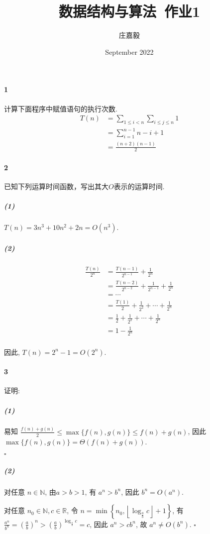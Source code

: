 \documentclass{ctexart}
\title{数据结构与算法~作业1}
\author{庄嘉毅}
\date{September 2022}
\def\QED{\hfill $\square$}
\begin{document}
\maketitle

\paragraph*{1} 计算下面程序中赋值语句的执行次数.
\begin{align*}
    T(n) & = \sum_{1\le i<n} \sum_{i\le j \le n}1 \\
         & =\sum_{i=1}^{n-1} n-i+1                \\
         & = \frac{(n+2)(n-1)}{2}
\end{align*}

\paragraph*{2} 已知下列运算时间函数，写出其大$O$表示的运算时间.

\subparagraph*{(1)} $T(n)=3n^3+10n^2+2n=O(n^3)$.

\subparagraph*{(2)}
\begin{align*}
    \frac{T(n)}{2^n} & = \frac{T(n-1)}{2^{n-1}} + \frac{1}{2^n}                     \\
                     & = \frac{T(n-2)}{2^{n-2}} + \frac{1}{2^{n-1}} + \frac{1}{2^n} \\
                     & = \cdots                                                     \\
                     & = \frac{T(1)}{2} + \frac{1}{2^2} + \cdots + \frac{1}{2^n}    \\
                     & = \frac{1}{2} + \frac{1}{2^2} + \cdots + \frac{1}{2^n}       \\
                     & = 1 - \frac{1}{2^n}                                          \\
\end{align*}

因此, $T(n)=2^n-1=O(2^n)$.

\paragraph*{3} 证明:

\subparagraph*{(1)} 易知 $\frac{f(n)+g(n)}{2}\le \max\{f(n),g(n)\} \le f(n)+g(n)$,
因此 $\max\{f(n),g(n)\}=\Theta (f(n)+g(n))$.

\QED

\subparagraph*{(2)} 对任意 $n\in\mathbb{N}$, 由$a>b>1$, 有 $a^n>b^n$, 因此 $b^n=O(a^n)$.

对任意 $n_0\in\mathbb{N}, c\in\mathbb{R}$,
令 $n=\min\left\{n_0,\left\lfloor \log_{\frac{a}{b}} c\right\rfloor+1\right\}$,
有 $\frac{a^n}{b^n}=\left(\frac{a}{b}\right)^n>\left(\frac{a}{b}\right)^{\log_{\frac{a}{b}} c}=c$,
因此 $a^n > c b^n$, 故 $a^n\ne O(b^n)$. \QED
\end{document}
